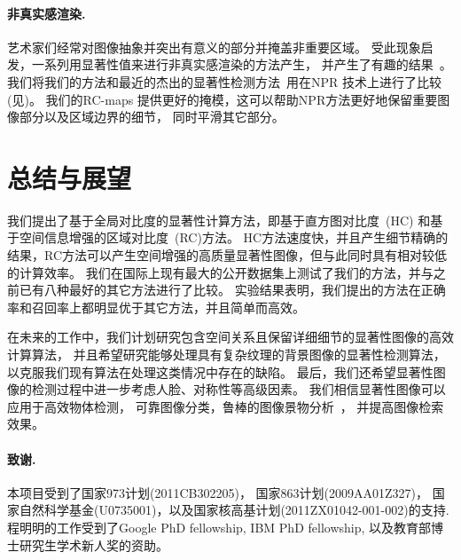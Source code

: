 \documentclass[final]{cvpr}
\newcommand{\RC}{RC-maps }
\newcommand{\mypara}[1]{\paragraph{#1.}}
\begin{document}
\mypara{非真实感渲染}
艺术家们经常对图像抽象并突出有意义的部分并掩盖非重要区域\cite{99/zeki_innerVision}。
受此现象启发，一系列用显著性值来进行非真实感渲染的方法产生，
并产生了有趣的结果~\cite{02tog/decarlo_stylization}。
我们将我们的方法和最近的杰出的显著性检测方法~\cite{09cvpr/Achanta_FTSaliency}用在NPR
技术\cite{10pg/Huang_Zhang}上进行了比较(见)。
我们的\RC 提供更好的掩模，这可以帮助NPR方法更好地保留重要图像部分以及区域边界的细节，
同时平滑其它部分。










\section{总结与展望}\label{sec:Conclusion}
我们提出了基于全局对比度的显著性计算方法，即基于直方图对比度~(HC) 和基于空间信息增强的区域对比度~(RC)方法。
HC方法速度快，并且产生细节精确的结果，RC方法可以产生空间增强的高质量显著性图像，但与此同时具有相对较低的计算效率。
我们在国际上现有最大的公开数据集上测试了我们的方法，并与之前已有八种最好的其它方法进行了比较。
实验结果表明，我们提出的方法在正确率和召回率上都明显优于其它方法，并且简单而高效。

在未来的工作中，我们计划研究包含空间关系且保留详细细节的显著性图像的高效计算算法，
并且希望研究能够处理具有复杂纹理的背景图像的显著性检测算法，
以克服我们现有算法在处理这类情况中存在的缺陷。
最后，我们还希望显著性图像的检测过程中进一步考虑人脸、对称性等高级因素。
我们相信显著性图像可以应用于高效物体检测\cite{06TCSVT/han_unsupervised}，
可靠图像分类，鲁棒的图像景物分析~\cite{journal/tog/ChengZMHH10}，
并提高图像检索效果\cite{tog09/ChenCT_Sketch2Photo}。


\paragraph{致谢.} 本项目受到了国家973计划(2011CB302205)， 国家863计划(2009AA01Z327)，
国家自然科学基金(U0735001)，以及国家核高基计划(2011ZX01042-001-002)的支持.
程明明的工作受到了Google PhD fellowship, IBM PhD fellowship, 以及教育部博士研究生学术新人奖的资助。

{\small


}

\end{document}
